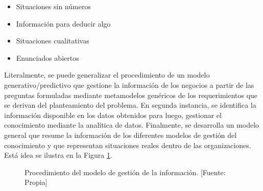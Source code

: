 \documentclass[11pt,titlepage]{report}
\begin{document}
\begin{itemize}
	\item Situaciones sin números
	\item Información para deducir algo
	\item Situaciones cualitativas
	\item Enunciados abiertos
\end{itemize}

Literalmente, se puede generalizar el procedimiento de un modelo generativo/predictivo que gestione la información de los negocios a partir de las preguntas formuladas mediante metamodelos genéricos de los requerimientos que se derivan del planteamiento del problema. En segunda instancia, se identifica la información disponible en los datos obtenidos para luego, gestionar el conocimiento mediante la analítica de datos. Finalmente, se desarrolla un modelo general que resume la información de los diferentes modelos de gestión del conocimiento y que representan situaciones reales dentro de las organizaciones. Está idea se ilustra en la Figura \ref{fig:modeloGestionN}.

\begin{figure}[h]
	\centering
\caption{Procedimiento del modelo de gestión de la información. [Fuente: Propia]} \label{fig:modeloGestionN}	
\end{figure}
\end{document}

